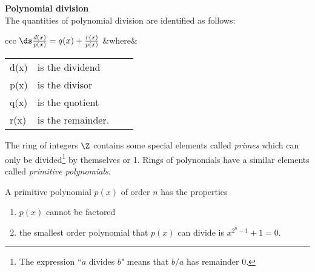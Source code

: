 \begin{definition} {\bf Polynomial division} \\
The quantities of polynomial division are identified as follows:

\begin{center}
\begin{tabular}{ccc}
$\ds \frac{d(x)}{p(x)} = q(x) + \frac{r(x)}{p(x)}$
&where&
\begin{tabular}{llll}
   d(x) & is the dividend \\
   p(x) & is the divisor  \\
   q(x) & is the quotient \\
   r(x) & is the remainder.
\end{tabular}
\end{tabular}
\end{center}
\end{definition}

The ring of integers $\Z$ contains some special elements called {\em primes}
which can only be divided\footnote{
   The expression ``$a$ divides $b$" means that $b/a$ has remainder 0.
}
 by themselves or 1.
Rings of polynomials have a similar elements called {\em primitive polynomials}.

\begin{definition}
\label{def:pn_primitive}
A primitive polynomial $p(x)$ of order $n$ has the properties
\begin{enumerate}
\setlength{\itemsep}{0ex}
   \item $p(x)$ cannot be factored
   \item the smallest order polynomial that $p(x)$ can divide is $x^{2^n-1}+1=0$.
\end{enumerate}
\end{definition}

